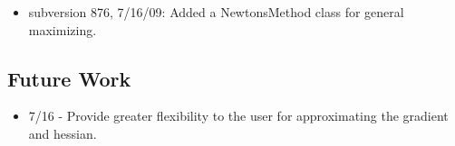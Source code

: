 \documentclass[10pt]{article}%
\begin{document}
\begin{itemize}\item  subversion 876, 7/16/09: Added a NewtonsMethod class for general maximizing.
\end{itemize}

\subsection*{Future Work}

\begin{itemize}\item  7/16 - Provide greater flexibility to the user for approximating the gradient and hessian.
\end{itemize}
    

%
\end{document}
